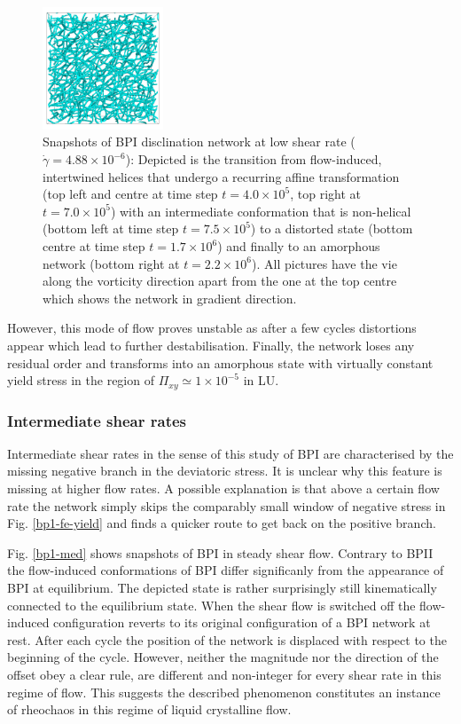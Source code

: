 \documentclass[aps,pre,reprint,superscriptaddress, twocolumn]{revtex4}
\newcommand{\e}[1]{\times10^{#1}}
\newcommand{\gd}{\dot{\gamma}}
\begin{document}
\begin{figure}[htpb]
\includegraphics[width=0.32\textwidth]{disc-xy-2200k_run1115.png}
\caption{Snapshots of BPI disclination network at low shear rate ($\dot{\gamma}=4.88\e{-6}$): Depicted is the transition from flow-induced, intertwined helices that undergo a recurring affine transformation (top left and centre at time step $t=4.0\e{5}$, top right at $t=7.0\e{5}$) with an intermediate conformation that is non-helical (bottom left at time step $t=7.5\e{5}$) to a distorted state (bottom centre at time step $t=1.7\e{6}$) and finally to an amorphous network (bottom right at $t=2.2\e{6}$). All pictures have the vie along the vorticity direction apart from the one at the top centre which shows the network in gradient direction.}
\label{bp1-low}
\end{figure}

However, this mode of flow proves unstable as after a few cycles 
distortions appear which lead to further destabilisation.
Finally, the network loses any residual order and 
transforms into an amorphous state with virtually constant
yield stress in the region of $\Pi_{xy}\simeq 1\e{-5}$ in LU.


\subsubsection{Intermediate shear rates}

Intermediate shear rates in the sense of this study of BPI are characterised 
by the missing negative branch in the deviatoric stress. It is unclear 
why this feature is missing at higher flow rates. A possible explanation is that 
above a certain flow rate the network simply skips the comparably small 
window of negative stress in Fig. \ref{bp1-fe-yield} and finds a quicker 
route to get back on the positive branch.

Fig. \ref{bp1-med} shows snapshots of BPI in steady shear flow. 
Contrary to BPII the flow-induced conformations of BPI differ significanly 
from the appearance of BPI at equilibrium. The depicted 
state is rather surprisingly still kinematically connected to the equilibrium state.
When the shear flow is switched off the flow-induced configuration reverts
to its original configuration of a BPI network at rest.
After each cycle the position of the network is displaced with respect to the beginning of the cycle.
However, neither the magnitude nor the direction of the offset obey a clear rule,
are different and non-integer for every shear rate in this regime of flow. 
This suggests the described phenomenon constitutes an instance of rheochaos in this 
regime of liquid crystalline flow. 
\end{document}
